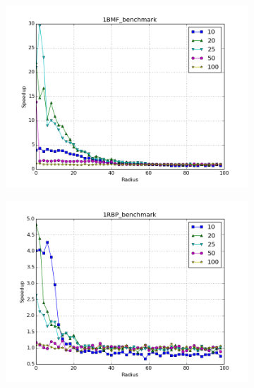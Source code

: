 \documentclass{amsbook}
\theoremstyle{definition}
\theoremstyle{remark}
\numberwithin{equation}{section}
\begin{document}
\begin{figure}[tbp]
\begin{subfigure}[b]{0.49\textwidth}
        \includegraphics[width=1\textwidth]{assets/1BMF_benchmark_euclid}
        \caption{}
    \end{subfigure}%
    \begin{subfigure}[b]{0.49\textwidth}
        \includegraphics[width=1\textwidth]{assets/1RBP_benchmark_euclid}
        \caption{}
    \end{subfigure}
    \begin{subfigure}[b]{0.49\textwidth}

\end{subfigure}
\end{figure}
\end{document}
